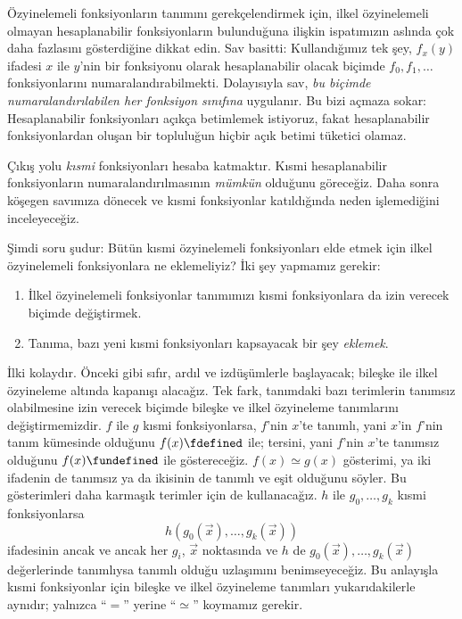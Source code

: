 


Özyinelemeli fonksiyonların tanımını gerekçelendirmek için, ilkel
özyinelemeli olmayan hesaplanabilir fonksiyonların bulunduğuna ilişkin
ispatımızın aslında çok daha fazlasını gösterdiğine dikkat edin. Sav basitti:
Kullandığımız tek şey, $f_x(y)$ ifadesi $x$ ile $y$'nin bir fonksiyonu olarak
hesaplanabilir olacak biçimde $f_0,f_1,\dots$ fonksiyonlarını
numaralandırabilmekti. Dolayısıyla sav, \emph{bu biçimde numaralandırılabilen
her fonksiyon sınıfına} uygulanır. Bu bizi açmaza sokar: Hesaplanabilir
fonksiyonları açıkça betimlemek istiyoruz, fakat hesaplanabilir
fonksiyonlardan oluşan bir topluluğun hiçbir açık betimi tüketici olamaz.

Çıkış yolu \emph{kısmi} fonksiyonları hesaba katmaktır. Kısmi hesaplanabilir
fonksiyonların numaralandırılmasının \emph{mümkün} olduğunu göreceğiz.
 Daha sonra köşegen savımıza dönecek ve kısmi fonksiyonlar
katıldığında neden işlemediğini inceleyeceğiz.

Şimdi soru şudur: Bütün kısmi özyinelemeli fonksiyonları elde etmek için
ilkel özyinelemeli fonksiyonlara ne eklemeliyiz? İki şey yapmamız gerekir:
\begin{enumerate}
\item İlkel özyinelemeli fonksiyonlar tanımımızı kısmi fonksiyonlara da izin
  verecek biçimde değiştirmek.
\item Tanıma, bazı yeni kısmi fonksiyonları kapsayacak bir şey
  \emph{eklemek}.
\end{enumerate}

İlki kolaydır. Önceki gibi sıfır, ardıl ve izdüşümlerle başlayacak; bileşke
ile ilkel özyineleme altında kapanışı alacağız. Tek fark, tanımdaki bazı
terimlerin tanımsız olabilmesine izin verecek biçimde bileşke ve ilkel
özyineleme tanımlarını değiştirmemizdir. $f$ ile $g$ kısmi fonksiyonlarsa,
$f$'nin $x$'te tanımlı, yani $x$'in $f$'nin tanım kümesinde olduğunu
$f(x)\fdefined$ ile; tersini, yani $f$'nin $x$'te tanımsız olduğunu
$f(x)\fundefined$ ile göstereceğiz. $f(x)\simeq g(x)$ gösterimi, ya iki
ifadenin de tanımsız ya da ikisinin de tanımlı ve eşit olduğunu söyler. Bu
gösterimleri daha karmaşık terimler için de kullanacağız. $h$ ile
$g_0,\dots,g_k$ kısmi fonksiyonlarsa
\[
  h(g_0(\vec x),\dots,g_k(\vec x))
\]
ifadesinin ancak ve ancak her $g_i$, $\vec x$ noktasında ve $h$ de
$g_0(\vec x),\dots,g_k(\vec x)$ değerlerinde tanımlıysa tanımlı olduğu
uzlaşımını benimseyeceğiz. Bu anlayışla kısmi fonksiyonlar için bileşke ve
ilkel özyineleme tanımları yukarıdakilerle aynıdır; yalnızca ``$=$'' yerine
``$\simeq$'' koymamız gerekir.

